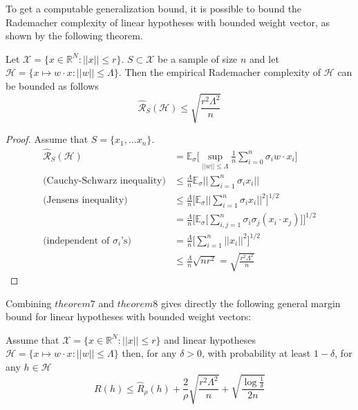 To get a computable generalization bound, it is possible to bound the Rademacher complexity of linear hypotheses with bounded weight vector, as shown by the following theorem.

\begin{theorem}
	Let $\mathcal{X} = \{x \in \mathbb{R}^N: ||x|| \leq r\}$. $S \subset \mathcal{X}$ be a sample of size $n$ and let $\mathcal{H}= \{x \mapsto w \cdot x : ||w||\leq \Lambda \}$.
	Then the empirical Rademacher complexity of $\mathcal{H}$ can be bounded as follows
	\begin{equation}
	\hat{\mathcal{R}}_S(\mathcal{H}) \leq \sqrt{\frac{r^2\Lambda^2}{n}}
	\end{equation}
\end{theorem}
\begin{proof}
	Assume that $S=\{x_1,...x_n\}$.
	\begin{align}
	\hat{\mathcal{R}}_S(\mathcal{H}) &= \mathbb{E}_{\sigma}\bigg[\sup_{||w||\leq \Lambda}\frac{1}{n} \sum_{i=0}^{n}\sigma_iw \cdot x_i\bigg] \\
	\text{(Cauchy-Schwarz inequality)}&\leq \frac{\Lambda}{n}\mathbb{E}_{\sigma} ||\sum_{i=1}^{n}\sigma_ix_i||\\
	\text{(Jensens inequality)}&\leq \frac{\Lambda}{n}\bigg[ \mathbb{E}_{\sigma} ||\sum_{i=1}^{n}\sigma_ix_i||^2 \bigg]^{1/2}\\
	&= \frac{\Lambda}{n}\bigg[ \mathbb{E}_{\sigma} \big[\sum_{i,j=1}^{n}\sigma_i\sigma_j(x_i\cdot x_j) \big] \bigg]^{1/2}\\
	\text{(independent of $\sigma_i$'s)}&= \frac{\Lambda}{n}\bigg[ \sum_{i=1}^{n}||x_i||^2 \bigg]^{1/2} \\
	&\leq \frac{\Lambda}{n}\sqrt{nr^2} = \sqrt{\frac{r^2\Lambda^2}{n}}
	\end{align}
\end{proof}
Combining $theorem7$ and $theorem8$ gives directly the following general
margin bound for linear hypotheses with bounded weight vectors:
\begin{corollary}
	Assume that $\mathcal{X} = \{x \in \mathbb{R}^N: ||x|| \leq r\}$ and linear hypotheses $\mathcal{H}= \{x \mapsto w \cdot x : ||w||\leq \Lambda \}$	then, for any $\delta>0$, with probability at least $1-\delta$, for any $h\in \mathcal{H}$
	\begin{equation}
	R(h) \leq \hat{R}_{\rho}(h) + \frac{2}{\rho}\sqrt{\frac{r^2\Lambda^2}{n}} + \sqrt{\frac{\log\frac{1}{\delta}}{2n}}
	\end{equation}
\end{corollary}

